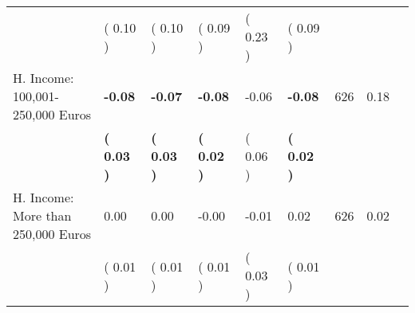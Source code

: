 \begin{tabular}{L{6.2cm} C{1.8cm} C{1.8cm} C{1.8cm} C{1.8cm} C{1.8cm} C{1.8cm} C{0.3cm} C{0.3cm}}
 & (     0.10 ) & (     0.10 ) & (     0.09 ) & (     0.23 ) & (     0.09 )  & \\
H. Income: 100,001-250,000 Euros & \textbf{    -0.08} & \textbf{    -0.07} & \textbf{    -0.08} &     -0.06 & \textbf{    -0.08}  & 626 &       0.18 \\ 
 & \textbf{(     0.03 )} & \textbf{(     0.03 )} & \textbf{(     0.02 )} & (     0.06 ) & \textbf{(     0.02 )}  & \\
H. Income: More than 250,000 Euros &      0.00 &      0.00 &     -0.00 &     -0.01 &      0.02  & 626 &       0.02 \\ 
 & (     0.01 ) & (     0.01 ) & (     0.01 ) & (     0.03 ) & (     0.01 )  & \\
\bottomrule
\end{tabular}
